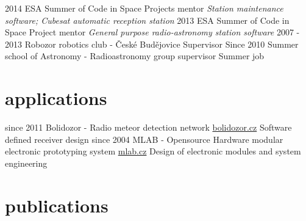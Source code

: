 \documentclass[]{friggeri-cv}
\begin{document}
\begin{entrylist}
  \entry
    {2014}
    {ESA Summer of Code in Space}
    {Projects mentor}
    {\emph{Station maintenance software; Cubesat automatic reception station}}
  \entry
    {2013}
    {ESA Summer of Code in Space}
    {Project mentor}
    {\emph{General purpose radio-astronomy station software}}
  \entry
    {2007 - 2013}
    {Robozor robotics club - České Budějovice}
    {Supervisor}
    {}
  \entry
    {Since 2010}
    {Summer school of Astronomy - Radioastronomy group supervisor}
    {Summer job}
    {}
\end{entrylist}

\section{applications}

\begin{entrylist}
  \entry
    {since 2011}
    {Bolidozor - Radio meteor detection network}
    {\href{http://wiki.bolidozor.cz/}{bolidozor.cz}}
    {Software defined receiver design}
  \entry
    {since 2004}
    {MLAB - Opensource Hardware modular electronic prototyping system}
    {\href{http://wiki.mlab.cz/}{mlab.cz}}
    {Design of electronic modules and system engineering}

\end{entrylist}

\section{publications}


\begin{refsection}
  \nocite{*}
  \printbibliography[sorting=chronological, type=inproceedings, title={international and local peer-reviewed conferences/proceedings}, notkeyword={france}, heading=subbibliography]
\end{refsection}
\begin{refsection}
  \nocite{*}
  \printbibliography[sorting=chronological, type=inproceedings, title={local peer-reviewed conferences/proceedings}, keyword={france}, heading=subbibliography]
\end{refsection}
\end{document}
